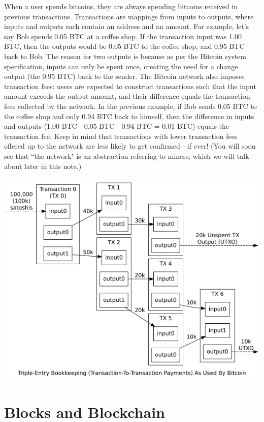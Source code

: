 \documentclass[full.tex]{subfiles}
\begin{document}
    When a user spends bitcoins, they are always spending bitcoins received in previous transactions. Transactions are mappings from inputs to outputs, where inputs and outputs each contain an address and an amount. For example, let's say Bob spends 0.05 BTC at a coffee shop. If the transaction input was 1.00 BTC, then the outputs would be 0.05 BTC to the coffee shop, and 0.95 BTC back to Bob. The reason for two outputs is because as per the Bitcoin system specification, inputs can only be spent once, creating the need for a change output (the 0.95 BTC) back to the sender. The Bitcoin network also imposes transaction fees: users are expected to construct transactions such that the input amount exceeds the output amount, and their difference equals the transaction fees collected by the network. In the previous example, if Bob sends 0.05 BTC to the coffee shop and only 0.94 BTC back to himself, then the difference in inputs and outputs (1.00 BTC - 0.05 BTC - 0.94 BTC = 0.01 BTC) equals the transaction fee. Keep in mind that transactions with lower transaction fees offered up to the network are less likely to get confirmed---if ever! (You will soon see that ``the network" is an abstraction referring to miners, which we will talk about later in this note.)
    
    \includegraphics[scale=0.9]{transactions}
    
    \section*{Blocks and Blockchain}
    
\end{document}
